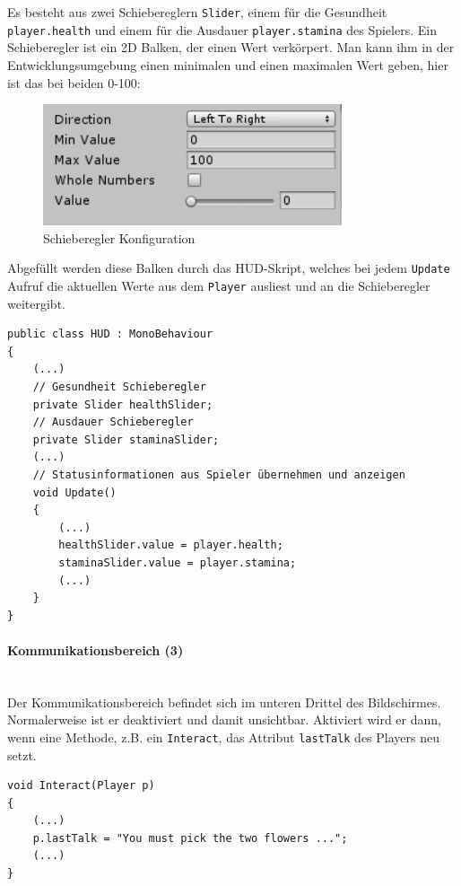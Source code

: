 Es besteht aus zwei Schiebereglern \lstinline{Slider}, einem für die Gesundheit \lstinline{player.health} und einem für die Ausdauer \lstinline{player.stamina} des Spielers.
Ein Schieberegler ist ein 2D Balken, der einen Wert verkörpert. Man kann ihm in der Entwicklungsumgebung einen minimalen und einen maximalen Wert geben, hier ist das bei beiden 0-100:

\begin{figure}[H]
\includegraphics[scale=1]{screenshots/nullhundert.png}
\caption{Schieberegler Konfiguration}
\end{figure}

Abgefüllt werden diese Balken durch das HUD-Skript, welches bei jedem \lstinline{Update} Aufruf die aktuellen Werte aus dem \lstinline{Player} ausliest und an die Schieberegler weitergibt.

\begin{lstlisting}[caption={Schieberegler aktualisieren}]
public class HUD : MonoBehaviour
{
	(...)
	// Gesundheit Schieberegler
	private Slider healthSlider;
	// Ausdauer Schieberegler
	private Slider staminaSlider;
	(...)
	// Statusinformationen aus Spieler übernehmen und anzeigen
	void Update()
	{
		(...)
		healthSlider.value = player.health;
		staminaSlider.value = player.stamina;
		(...)
	}
}
\end{lstlisting}

\paragraph{Kommunikationsbereich (3)}\mbox{} \\
Der Kommunikationsbereich befindet sich im unteren Drittel des Bildschirmes.
Normalerweise ist er deaktiviert und damit unsichtbar.
Aktiviert wird er dann, wenn eine Methode, z.B. ein \lstinline{Interact}, das Attribut \lstinline{lastTalk} des Players neu setzt. 

\begin{lstlisting}[caption={Kommunikation setzen}]
void Interact(Player p)
{
	(...)
	p.lastTalk = "You must pick the two flowers ...";
	(...)
}
\end{lstlisting}

